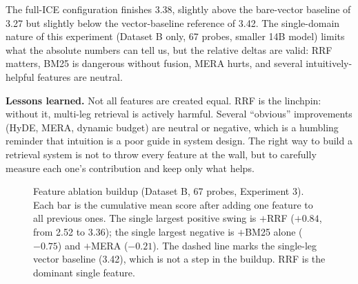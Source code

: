 \documentclass[11pt,a4paper]{article}
\begin{document}
The full-ICE configuration finishes 3.38, slightly above the bare-vector baseline of 3.27 but slightly below the vector-baseline reference of 3.42. The single-domain nature of this experiment (Dataset B only, 67 probes, smaller 14B model) limits what the absolute numbers can tell us, but the relative deltas are valid: RRF matters, BM25 is dangerous without fusion, MERA hurts, and several intuitively-helpful features are neutral.

\textbf{Lessons learned.} Not all features are created equal. RRF is the linchpin: without it, multi-leg retrieval is actively harmful. Several ``obvious'' improvements (HyDE, MERA, dynamic budget) are neutral or negative, which is a humbling reminder that intuition is a poor guide in system design. The right way to build a retrieval system is not to throw every feature at the wall, but to carefully measure each one's contribution and keep only what helps.

\begin{figure}[t]
\centering
{}
\caption{Feature ablation buildup (Dataset B, 67 probes, Experiment 3). Each bar is the cumulative mean score after adding one feature to all previous ones. The single largest positive swing is $+$RRF ($+0.84$, from 2.52 to 3.36); the single largest negative is $+$BM25 alone ($-0.75$) and $+$MERA ($-0.21$). The dashed line marks the single-leg vector baseline (3.42), which is not a step in the buildup. RRF is the dominant single feature.}
\label{fig:ablation-waterfall}
\end{figure}
\end{document}
